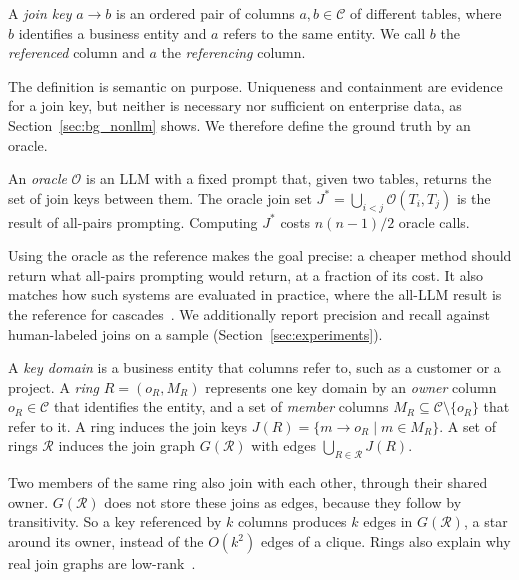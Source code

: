 \begin{definition}
A \emph{join key} $a \rightarrow b$ is an ordered pair of columns $a, b \in \mathcal{C}$ of different tables, where $b$ identifies a business entity and $a$ refers to the same entity.
We call $b$ the \emph{referenced} column and $a$ the \emph{referencing} column.
\end{definition}

The definition is semantic on purpose.
Uniqueness and containment are evidence for a join key, but neither is necessary nor sufficient on enterprise data, as Section~\ref{sec:bg_nonllm} shows.
We therefore define the ground truth by an oracle.

\begin{definition}
An \emph{oracle} $\mathcal{O}$ is an LLM with a fixed prompt that, given two tables, returns the set of join keys between them.
The oracle join set $J^* = \bigcup_{i<j} \mathcal{O}(T_i, T_j)$ is the result of all-pairs prompting.
Computing $J^*$ costs $n(n-1)/2$ oracle calls.
\end{definition}

Using the oracle as the reference makes the goal precise: a cheaper method should return what all-pairs prompting would return, at a fraction of its cost.
It also matches how such systems are evaluated in practice, where the all-LLM result is the reference for cascades~\cite{SUPG,BARGAIN,FDJ}.
We additionally report precision and recall against human-labeled joins on a sample (Section~\ref{sec:experiments}).

\begin{definition}
A \emph{key domain} is a business entity that columns refer to, such as a customer or a project.
A \emph{ring} $R = (o_R, M_R)$ represents one key domain by an \emph{owner} column $o_R \in \mathcal{C}$ that identifies the entity, and a set of \emph{member} columns $M_R \subseteq \mathcal{C} \setminus \{o_R\}$ that refer to it.
A ring induces the join keys $J(R) = \{ m \rightarrow o_R \mid m \in M_R \}$.
A set of rings $\mathcal{R}$ induces the join graph $G(\mathcal{R})$ with edges $\bigcup_{R \in \mathcal{R}} J(R)$.
\end{definition}

Two members of the same ring also join with each other, through their shared owner.
$G(\mathcal{R})$ does not store these joins as edges, because they follow by transitivity.
So a key referenced by $k$ columns produces $k$ edges in $G(\mathcal{R})$, a star around its owner, instead of the $O(k^2)$ edges of a clique.
Rings also explain why real join graphs are low-rank~\cite{Nexus}.

